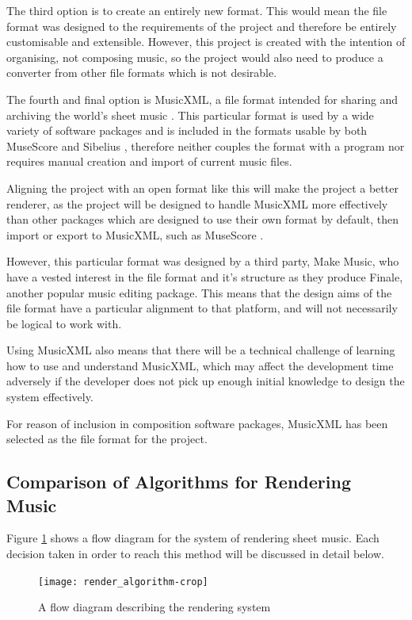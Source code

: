 The third option is to create an entirely new format. This would mean the file format was designed to the requirements of the project and therefore be entirely customisable and extensible. However, this project is created with the intention of organising, not composing music, so the project would also need to produce a converter from other file formats which is not desirable.

The fourth and final option is MusicXML, a file format intended for sharing and archiving the world's sheet music \parencite{mxml}. This particular format is used by a wide variety of software packages \parencite{mxml} and is included in the formats usable by both MuseScore \parencite{MuseTour} and Sibelius \parencite{avid}, therefore neither couples the format with a program nor requires manual creation and import of current music files. 

Aligning the project with an open format like this will make the project a better renderer, as the project will be designed to handle MusicXML more effectively than other packages which are designed to use their own format by default, then import or export to MusicXML, such as MuseScore \parencite{mscoreBugTracker}.

However, this particular format was designed by a third party, Make Music, who have a vested interest in the file format and it's structure as they produce Finale, another popular music editing package\parencite{mxmlSoft}. This means that the design aims of the file format have a particular alignment to that platform, and will not necessarily be logical to work with.

Using MusicXML also means that there will be a technical challenge of learning how to use and understand MusicXML, which may affect the development time adversely if the developer does not pick up enough initial knowledge to design the system effectively.

For reason of inclusion in composition software packages, MusicXML has been selected as the file format for the project. 

\subsection{Comparison of Algorithms for Rendering Music}
Figure \ref{fig:flow} shows a flow diagram for the system of rendering sheet music. Each decision taken in order to reach this method will be discussed in detail below.
\begin{figure}[H]
    \centering
    \texttt{[image: render\_algorithm-crop]}
    \caption{A flow diagram describing the rendering system}
    \label{fig:flow}
\end{figure}

